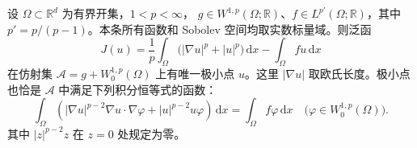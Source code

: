 \begin{theorem}\label{b1:thm:sobolev-variational-minimum}
设 \(\Omega\subset\mathbb R^d\) 为有界开集，\(1<p<\infty\)，
\(g\in W^{1,p}(\Omega;\mathbb R)\)、\(f\in L^{p'}(\Omega;\mathbb R)\)，其中 \(p'=p/(p-1)\)。本条所有函数和 Sobolev 空间均取实数标量域。则泛函
\[
 J(u)=\frac1p\int_\Omega\bigl(|\nabla u|^p+|u|^p\bigr)\,\mathrm dx
                -\int_\Omega fu\,\mathrm dx
\]
在仿射集 \(\mathcal A=g+W_0^{1,p}(\Omega)\) 上有唯一极小点 \(u\)。这里
\(|\nabla u|\) 取欧氏长度。极小点也恰是 \(\mathcal A\) 中满足下列积分恒等式的函数：
\begin{equation}\label{b1:eq:sobolev-euler-lagrange}
 \int_\Omega\left(
   |\nabla u|^{p-2}\nabla u\cdot\nabla\varphi
       +|u|^{p-2}u\varphi
 \right)\,\mathrm dx
 =\int_\Omega f\varphi\,\mathrm dx
 \quad\bigl(\varphi\in W_0^{1,p}(\Omega)\bigr).
\end{equation}
其中 \(|z|^{p-2}z\) 在 \(z=0\) 处规定为零。
\end{theorem}
